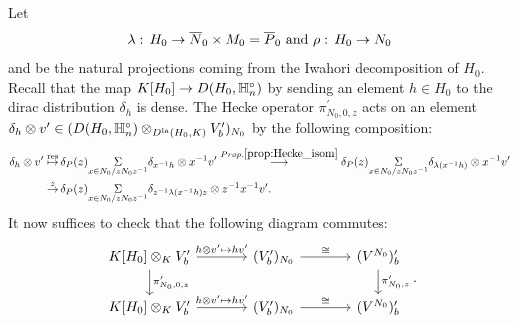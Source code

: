 \documentclass[10pt]{amsart}
\begin{document}
Let \begin{equation*}
    \lambda: \,H_{0} \rightarrow \overline{N}_{0} \times M_{0} = \overline{P}_{0} \textnormal{ and }\rho:  \,H_{0} \rightarrow N_{0}
\end{equation*} and be the natural projections coming from the Iwahori decomposition of $H_{0}$. Recall that the map $K[H_{0}]\rightarrow D(H_{0},\mathbb{H}_{n}^{\circ})$ by sending an element $h\in H_{0}$ to the dirac distribution $\delta_{h}$ is dense. The Hecke operator $\pi^{\prime}_{N_{0},0,z}$ acts on an element $\delta_{h}\otimes v^{\prime}\in (D(H_{0},\mathbb{H}_{n}^{\circ}) \otimes_{D^{\textnormal{la}}(H_{0},K)} V^{\prime}_{b})_{N_{0}}$ by the following composition: \begin{equation}\begin{split}
    \delta_{h}\otimes v^{\prime} \overset{\textnormal{res}}{\mapsto} & \, \delta_{P}(z)\underset{x\in N_{0}/zN_{0}z^{-1}}{\Sigma} \delta_{x^{-1}h}\otimes x^{-1}v^{\prime}  \overset{Prop. \ref{prop:Hecke_isom}}{\longrightarrow} \delta_{P}(z)\underset{x\in N_{0}/zN_{0}z^{-1}}{\Sigma} \delta_{\lambda(x^{-1}h)}\otimes x^{-1}v^{\prime} \\
    \overset{z}{\rightarrow} & \,\delta_{P}(z)\underset{x\in N_{0}/zN_{0}z^{-1}}{\Sigma} \delta_{z^{-1}\lambda(x^{-1}h)z}\otimes z^{-1}x^{-1}v^{\prime}.
\end{split}\end{equation} 
It now suffices to check that the following diagram commutes: \begin{equation}\label{diag: Hecke_compatibility2}
\begin{tikzcd}[column sep=large]
    K[H_{0}] \otimes_{K} V^{\prime}_{b} \arrow[r,"h\otimes v^{\prime}\map hv^{\prime}"] \arrow[d,"\pi_{N_{0},0,z}^{\prime}"] & (V^{\prime}_{b})_{N_{0}} \arrow[r,"\cong"] & (V^{N_{0}})^{\prime}_{b} \arrow[d,"\pi_{N_{0},z}^{\prime}"]  \\
    K[H_{0}] \otimes_{K} V^{\prime}_{b} \arrow[r,"h\otimes v^{\prime}\map hv^{\prime}"] & (V^{\prime}_{b})_{N_{0}} \arrow[r,"\cong"] & (V^{N_{0}})^{\prime}_{b}
\end{tikzcd}.
\end{equation} 
\end{document}

